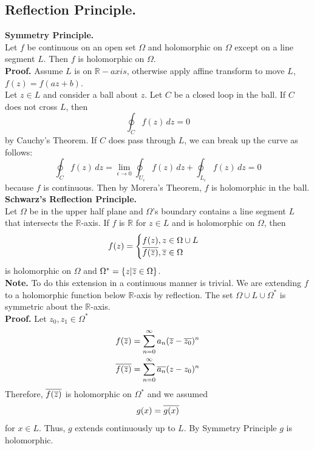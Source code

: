 \documentclass[11pt]{article}
\begin{document}
\subsection{Reflection Principle.}
\textbf{Symmetry Principle.} \\
Let $f$ be continuous on an open set $\Omega$ and holomorphic on $\Omega$ except on a line segment $L$. Then $f$ is holomorphic on $\Omega$. \\
\textbf{Proof.} 
Assume $L$ is on $\mathbb{R}-axis$, otherwise apply affine transform to move $L$, $f(z) = f(az + b)$. \\
Let $z \in L$ and consider a ball about $z$. Let $C$ be a closed loop in the ball. If $C$ does not cross $L$, then 
$$\oint_C f(z) \, dz = 0$$ 
by Cauchy's Theorem. If $C$ does pass through $L$, we can break up the curve as follows: 
$$ \oint_Cf(z)\,dz = \lim_{\epsilon \to 0} \oint_{U_\epsilon} f(z) \, dz + \oint_{L_\epsilon} f(z) \, dz = 0$$
because $f$ is continuous. Then by Morera's Theorem, $f$ is holomorphic in the ball. \\
\newline
\textbf{Schwarz's Reflection Principle.} \\
Let $\Omega$ be in the upper half plane and $\Omega$'s boundary contains a line segment $L$ that intersects the $\mathbb{R}$-axis. If $f$ is $\mathbb{R}$ for $z \in L$ and is holomorphic on $\Omega$, then 
$$
f(z) = 
\begin{cases} 
	f(z), z \in \Omega \cup L \\
	\overline{f(\overline{z})}, \overline{z} \in \Omega \\
\end{cases}
$$
is holomorphic on $\Omega$ and $\Omega^\ast = \{z|\overline{z} \in \Omega \}$. \\
\textbf{Note.} To do this extension in a continuous manner is trivial. We are extending $f$ to a holomorphic function below $\mathbb{R}$-axis by reflection. The set $\Omega \cup L \cup \Omega^\ast$ is symmetric about the $\mathbb{R}$-axis. \\
\textbf{Proof.} Let $z_0, z_1 \in \Omega^\ast$ 
\begin{align*}
f(\overline{z}) &= \sum_{n = 0}^{\infty}a_n(\overline{z} - \overline{z_0})^n \\
\overline{f(\overline{z})} &= \sum_{n = 0}^{\infty} \overline{a_n}(z - z_0)^n
\end{align*}
Therefore, $\overline{f(\overline{z})}$ is holomorphic on $\Omega^\ast$ and we assumed 
$$g(x) = \overline{g(x)}$$
for $x \in L$. Thus, $g$ extends continuously up to $L$. By Symmetry Principle $g$ is holomorphic. \\
\end{document}

